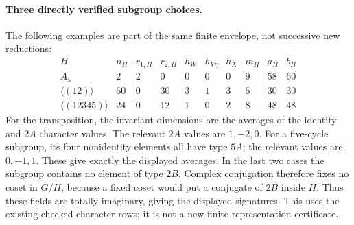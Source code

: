 \paragraph{Three directly verified subgroup choices.}
The following examples are part of the same finite
envelope, not successive new reductions:
\[
\begin{array}{c|r|rr|rrr|r|rr}
 H&n_H&r_{1,H}&r_{2,H}&h_W&h_{V\eta}&h_X&m_H&a_H&b_H\\ \hline
 A_5&2&2&0&0&0&0&9&58&60\\
 \langle(12)\rangle&60&0&30&3&1&3&5&30&30\\
 \langle(12345)\rangle&24&0&12&1&0&2&8&48&48
\end{array}
 \tag{MA-RB.194}
\]
For the transposition, the invariant dimensions
are the averages of the identity and \(2A\)
character values. The relevant \(2A\) values
are \(1,-2,0\). For a five-cycle subgroup,
its four nonidentity elements all have type \(5A\);
the relevant values are \(0,-1,1\).
These give exactly the displayed averages.
In the last two cases the subgroup contains
no element of type \(2B\). Complex conjugation
therefore fixes no coset in \(G/H\), because
a fixed coset would put a conjugate of \(2B\)
inside \(H\). Thus these fields are totally
imaginary, giving the displayed signatures.
This uses the existing checked character rows;
it is not a new finite-representation certificate.

